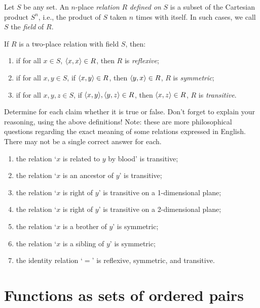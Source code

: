 \begin{defn}
Let $S$ be any set. An $n$-place \textit{relation} $R$ \textit{defined on} $S$ is a subset of the Cartesian product $S^n$, i.e., the product of $S$ taken $n$ times with itself. In such cases, we call $S$ the \textit{field} of $R$. 

If $R$ is a two-place relation with field $S$, then: 
\begin{enumerate}
	\item if for all $x \in S$, $\langle x, x\rangle \in R$, then $R$ is \textit{reflexive};
	\item if for all $x, y \in S$, if $\langle x, y\rangle \in R$, then $\langle y, x\rangle \in R$, $R$ is \textit{symmetric};
	\item if for all $x, y, z \in S$, if $\langle x, y\rangle, \langle y, z\rangle \in R$, then $\langle x, z\rangle \in R$, $R$ is \textit{transitive}. 
\end{enumerate}
\end{defn}

\begin{exc}
Determine for each claim whether it is true or false. Don't forget to explain your reasoning, using the above definitions! Note: these are more philosophical questions regarding the exact meaning of some relations expressed in English. There may not be a single correct answer for each. 

\begin{enumerate}
	\item the relation `$x$ is related to $y$ by blood' is transitive;
	\item the relation `$x$ is an ancestor of $y$' is transitive;
	\item the relation `$x$ is right of $y$' is transitive on a 1-dimensional plane;
	\item the relation `$x$ is right of $y$' is transitive on a 2-dimensional plane;
	\item the relation `$x$ is a brother of $y$' is symmetric;
	\item the relation `$x$ is a sibling of $y$' is symmetric;
	\item the identity relation `$=$' is reflexive, symmetric, and transitive. 
\end{enumerate}
\end{exc}

\section{Functions as sets of ordered pairs}

